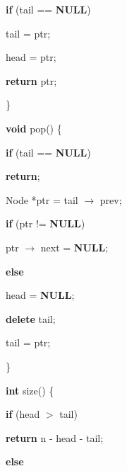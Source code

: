 \begin{algorithm}
\begin{algorithmic}
		\State \hspace{2cm} \textbf{if} (tail == \textbf{NULL})

		\State \hspace{3cm} tail = ptr;

		\State \hspace{2cm} head = ptr;

		\State \hspace{2cm} \textbf{return} ptr;

		\State \hspace{1cm} \}

		\vspace{0.5cm}

		\State \hspace{1cm} \textbf{void} pop() \{

		\State \hspace{2cm} \textbf{if} (tail == \textbf{NULL})

		\State \hspace{3cm} \textbf{return};

		\State \hspace{2cm} Node *ptr = tail $\rightarrow$ prev;

		\State \hspace{2cm} \textbf{if} (ptr != \textbf{NULL})

		\State \hspace{3cm} ptr $\rightarrow$ next = \textbf{NULL};

		\State \hspace{2cm} \textbf{else}

		\State \hspace{3cm} head = \textbf{NULL};

		\State \hspace{2cm} \textbf{delete} tail;

		\State \hspace{2cm} tail = ptr;

		\State \hspace{1cm} \}

		\vspace{0.5cm}

		\State \textbf{int} size() \{

		\State \hspace{1cm} \textbf{if} (head $>$ tail)

		\State \hspace{2cm} \textbf{return} n - head - tail;

		\State \hspace{1cm} \textbf{else}


\end{algorithmic}
\end{algorithm}
